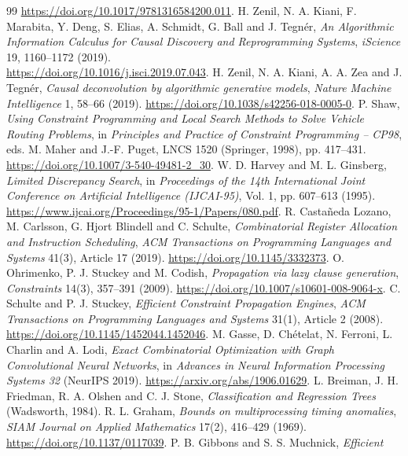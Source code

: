 \documentclass[11pt,a4paper]{article}
\begin{document}
\begin{thebibliography}{99}
\url{https://doi.org/10.1017/9781316584200.011}.
 H. Zenil, N. A. Kiani, F. Marabita, Y. Deng,
S. Elias, A. Schmidt, G. Ball and J. Tegnér, \emph{An Algorithmic Information
Calculus for Causal Discovery and Reprogramming Systems}, \emph{iScience}
19, 1160--1172 (2019).\\ \url{https://doi.org/10.1016/j.isci.2019.07.043}.
 H. Zenil, N. A. Kiani, A. A. Zea and
J. Tegnér, \emph{Causal deconvolution by algorithmic generative models},
\emph{Nature Machine Intelligence} 1, 58--66 (2019).
\url{https://doi.org/10.1038/s42256-018-0005-0}.
 P. Shaw, \emph{Using Constraint Programming and Local Search
Methods to Solve Vehicle Routing Problems}, in \emph{Principles and Practice of
Constraint Programming -- CP98}, eds. M. Maher and J.-F. Puget, LNCS 1520
(Springer, 1998), pp. 417--431. \url{https://doi.org/10.1007/3-540-49481-2_30}.
 W. D. Harvey and M. L. Ginsberg, \emph{Limited Discrepancy
Search}, in \emph{Proceedings of the 14th International Joint Conference on
Artificial Intelligence (IJCAI-95)}, Vol. 1, pp. 607--613 (1995).
\url{https://www.ijcai.org/Proceedings/95-1/Papers/080.pdf}.
 R. Castañeda Lozano, M. Carlsson, G. Hjort Blindell and
C. Schulte, \emph{Combinatorial Register Allocation and Instruction Scheduling},
\emph{ACM Transactions on Programming Languages and Systems} 41(3), Article 17
(2019). \url{https://doi.org/10.1145/3332373}.
 O. Ohrimenko, P. J. Stuckey and M. Codish,
\emph{Propagation via lazy clause generation}, \emph{Constraints} 14(3),
357--391 (2009). \url{https://doi.org/10.1007/s10601-008-9064-x}.
 C. Schulte and P. J. Stuckey, \emph{Efficient Constraint
Propagation Engines}, \emph{ACM Transactions on Programming Languages and
Systems} 31(1), Article 2 (2008). \url{https://doi.org/10.1145/1452044.1452046}.
 M. Gasse, D. Chételat, N. Ferroni, L. Charlin and A. Lodi,
\emph{Exact Combinatorial Optimization with Graph Convolutional Neural Networks},
in \emph{Advances in Neural Information Processing Systems 32} (NeurIPS 2019).
\url{https://arxiv.org/abs/1906.01629}.
 L. Breiman, J. H. Friedman, R. A. Olshen and C. J. Stone,
\emph{Classification and Regression Trees} (Wadsworth, 1984).
 R. L. Graham, \emph{Bounds on multiprocessing timing
anomalies}, \emph{SIAM Journal on Applied Mathematics} 17(2), 416--429 (1969).
\url{https://doi.org/10.1137/0117039}.
 P. B. Gibbons and S. S. Muchnick, \emph{Efficient
}
\end{thebibliography}
\end{document}
